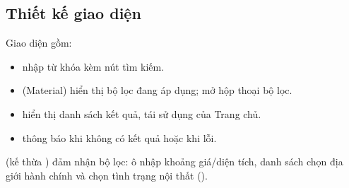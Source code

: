 \subsection{Thiết kế giao diện}
Giao diện  gồm:
\begin{itemize}
    \item {} nhập từ khóa kèm nút tìm kiếm.
    \item {} (Material) hiển thị bộ lọc đang áp dụng;
     mở hộp thoại bộ lọc.
    \item {} hiển thị danh sách kết quả, tái sử dụng
     của Trang chủ.
    \item {} thông báo khi không có kết quả hoặc khi lỗi.
\end{itemize}
 (kế thừa )
đảm nhận bộ lọc: ô nhập khoảng giá/diện tích, danh sách chọn địa giới hành
chính và  chọn tình trạng nội thất ().


